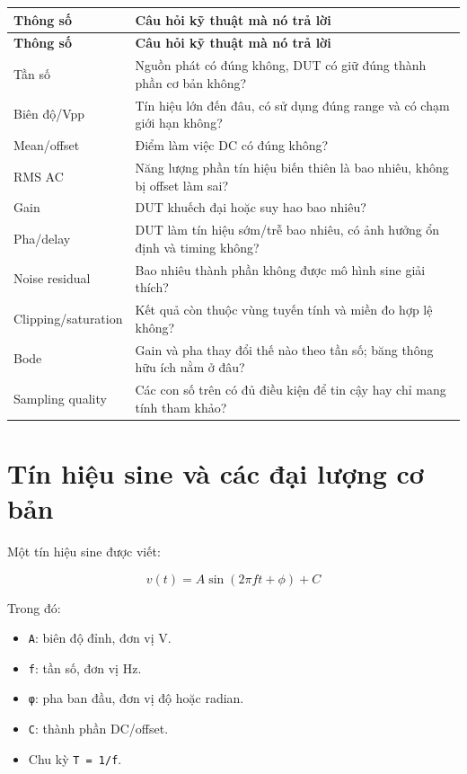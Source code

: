 \documentclass[12pt,a4paper,oneside]{article}
\newcommand{\inlinecode}[1]{\texttt{#1}}
\begin{document}
\begin{longtable}{|>{\raggedright\arraybackslash}p{}|>{\raggedright\arraybackslash}p{}|}
\hline
\textbf{Thông số} & \textbf{Câu hỏi kỹ thuật mà nó trả lời} \\ \hline
\endfirsthead
\hline
\textbf{Thông số} & \textbf{Câu hỏi kỹ thuật mà nó trả lời} \\ \hline
\endhead
Tần số & Nguồn phát có đúng không, DUT có giữ đúng thành phần cơ bản không? \\ \hline
Biên độ/Vpp & Tín hiệu lớn đến đâu, có sử dụng đúng range và có chạm giới hạn không? \\ \hline
Mean/offset & Điểm làm việc DC có đúng không? \\ \hline
RMS AC & Năng lượng phần tín hiệu biến thiên là bao nhiêu, không bị offset làm sai? \\ \hline
Gain & DUT khuếch đại hoặc suy hao bao nhiêu? \\ \hline
Pha/delay & DUT làm tín hiệu sớm/trễ bao nhiêu, có ảnh hưởng ổn định và timing không? \\ \hline
Noise residual & Bao nhiêu thành phần không được mô hình sine giải thích? \\ \hline
Clipping/saturation & Kết quả còn thuộc vùng tuyến tính và miền đo hợp lệ không? \\ \hline
Bode & Gain và pha thay đổi thế nào theo tần số; băng thông hữu ích nằm ở đâu? \\ \hline
Sampling quality & Các con số trên có đủ điều kiện để tin cậy hay chỉ mang tính tham khảo? \\ \hline
\end{longtable}

\section{Tín hiệu sine và các đại lượng cơ bản}

Một tín hiệu sine được viết:

\[
v(t)=A\sin(2\pi f t+\phi)+C
\]

Trong đó:

\begin{itemize}
\item \inlinecode{A}: biên độ đỉnh, đơn vị V.
\item \inlinecode{f}: tần số, đơn vị Hz.
\item \inlinecode{φ}: pha ban đầu, đơn vị độ hoặc radian.
\item \inlinecode{C}: thành phần DC/offset.
\item Chu kỳ \inlinecode{T = 1/f}.
\end{itemize}
\end{document}
